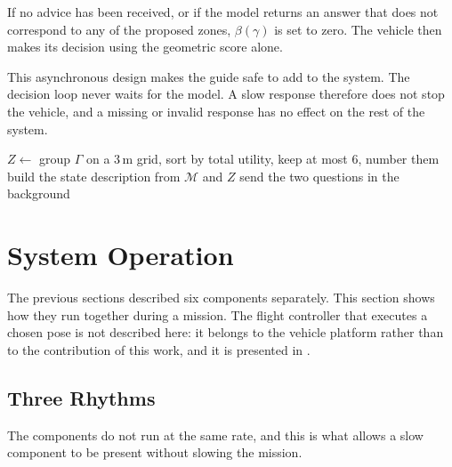 If no advice has been received, or if the model returns an answer that does not
correspond to any of the proposed zones, $\beta(\gamma)$ is set to zero. The
vehicle then makes its decision using the geometric score alone.

This asynchronous design makes the guide safe to add to the system. The decision
loop never waits for the model. A slow response therefore does not stop the
vehicle, and a missing or invalid response has no effect on the rest of the
system.

\begin{algorithm}[!htb]
    \caption{RequestAdvice}%
    \label{algo:sys:advice}
    $Z \gets$ group $\Gamma$ on a 3\,m grid, sort by total utility, keep at most 6, number them\;
    build the state description from $\mathcal{M}$ and $Z$ 
    send the two questions in the background\;
\end{algorithm}

\FloatBarrier

\section{System Operation}%
\label{sec:sys:mission}%
\label{sec:sys:loop}

The previous sections described six components separately. This section shows how
they run together during a mission. The flight controller that executes a chosen
pose is not described here: it belongs to the vehicle platform rather than to the
contribution of this work, and it is presented in .

\subsection{Three Rhythms}%
\label{subsec:sys:rhythms}

The components do not run at the same rate, and this is what allows a slow
component to be present without slowing the mission.

